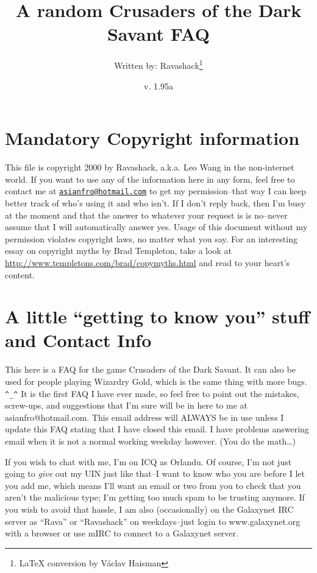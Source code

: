 \documentclass[12pt]{article}
\title{A random Crusaders of the Dark Savant FAQ}
\author{Written by: Ravashack\protect\footnote{\LaTeX{} conversion by Václav Haisman}}
\date{v. 1.95a}
\begin{document}
\maketitle

\section{Mandatory Copyright
information}\label{mandatory-copyright-information}

This file is copyright 2000 by Ravashack, a.k.a. Leo Wang in the non-internet
world. If you want to use any of the information here in any form, feel free
to contact me at
\href{mailto:asianfro@hotmail.com}{\nolinkurl{asianfro@hotmail.com}} to get
my permission--that way I can keep better track of who's using it and who
isn't. If I don't reply back, then I'm busy at the moment and that the answer
to whatever your request is is no--never assume that I will automatically
answer yes. Usage of this document without my permission violates copyright
laws, no matter what you say. For an interesting essay on copyright myths by
Brad Templeton, take a look at
\url{http://www.templetons.com/brad/copymyths.html} and read to your heart's
content.

\section{\texorpdfstring{A little ``getting to know you'' stuff and
Contact
Info}{A little getting to know you stuff and Contact Info}}\label{a-little-getting-to-know-you-stuff-and-contact-info}

This here is a FAQ for the game Crusaders of the Dark Savant. It can also be
used for people playing Wizardry Gold, which is the same thing with more
bugs. \texttt{\^{}\_\^{}} It is the first FAQ I have ever made, so feel free
to point out the mistakes, screw-ups, and suggestions that I'm sure will be
in here to me at asianfro@hotmail.com. This email address will ALWAYS be in
use unless I update this FAQ stating that I have closed this email. I have
problems answering email when it is not a normal working weekday
however. (You do the math\ldots{})

If you wish to chat with me, I'm on ICQ as Orlandu. Of course, I'm not
just going to \emph{give} out my UIN just like that--I want to know who
you are before I let you add me, which means I'll want an email or two
from you to check that you aren't the malicious type; I'm getting too
much spam to be trusting anymore. If you wish to avoid that hassle, I am
also (occasionally) on the Galaxynet IRC server as ``Rava'' or
``Ravashack'' on weekdays--just login to www.galaxynet.org with a
browser or use mIRC to connect to a Galaxynet server.
\end{document}
